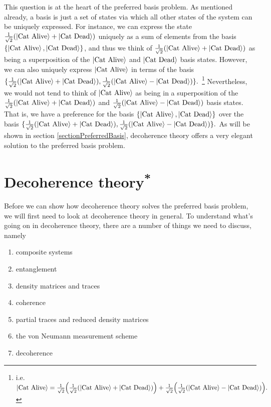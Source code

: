 \documentclass[letter, 12pt]{turabian-thesis}
\theoremstyle{hypothesis}
\let\origfootnote\footnote %
\renewcommand{\footnote}[1]{%
\noindent %
\origfootnote{#1}}
\begin{document}
This question is at the heart of the preferred basis problem. As mentioned already, a basis is just a set of states via which all other states of the system can be uniquely expressed. For instance, we can express the state $\frac{1}{\sqrt{2}}(\ket{\text{Cat Alive}}+\ket{\text{Cat Dead}})$ uniquely as a sum of elements from the basis $\{\ket{\text{Cat Alive}}, \ket{\text{Cat Dead}}\}$, and thus we think of $\frac{1}{\sqrt{2}}(\ket{\text{Cat Alive}}+\ket{\text{Cat Dead}})$ as being a superposition of the $\ket{\text{Cat Alive}}$ and $\ket{\text{Cat Dead}}$ basis states. However, we can also uniquely express  $\ket{\text{Cat Alive}}$ in terms of the basis $\{\frac{1}{\sqrt{2}}(\ket{\text{Cat Alive}}+\ket{\text{Cat Dead}}), \frac{1}{\sqrt{2}}(\ket{\text{Cat Alive}}-\ket{\text{Cat Dead}})\}.$\footnote{i.e. $\ket{\text{Cat Alive}}= \frac{1}{\sqrt{2}}\Big(\frac{1}{\sqrt{2}}(\ket{\text{Cat Alive}}+\ket{\text{Cat Dead}})\Big)+\frac{1}{\sqrt{2}}\Big( \frac{1}{\sqrt{2}}(\ket{\text{Cat Alive}}-\ket{\text{Cat Dead}})\Big). $} Nevertheless, we would not tend to think of $\ket{\text{Cat Alive}}$ as being in a superposition of the $\frac{1}{\sqrt{2}}(\ket{\text{Cat Alive}}+\ket{\text{Cat Dead}}) $ and $\frac{1}{\sqrt{2}}(\ket{\text{Cat Alive}}-\ket{\text{Cat Dead}})$ basis states. That is, we have a preference for the basis $\{\ket{\text{Cat Alive}}, \ket{\text{Cat Dead}}\}$ over the basis $\{\frac{1}{\sqrt{2}}(\ket{\text{Cat Alive}}+\ket{\text{Cat Dead}}), \frac{1}{\sqrt{2}}(\ket{\text{Cat Alive}}-\ket{\text{Cat Dead}})\}.$ As will be shown in section \ref{sectionPreferredBasis}, decoherence theory offers a very elegant solution to the preferred basis problem.

\section{Decoherence theory\label{decotheory}\textsuperscript{*}\protect\footnotemark}
\renewcommand{\thefootnote}{\fnsymbol{footnote}}
\renewcommand*{\thefootnote}{\arabic{footnote}}
Before we can show how decoherence theory solves the preferred basis problem, we will first need to look at decoherence theory in general. To understand what's going on in decoherence theory, there are a number of things we need to discuss, namely
\begin{enumerate}[noitemsep, nosep, topsep=0pt]
\item composite systems
\item entanglement
\item density matrices and traces 
\item coherence
\item partial traces and reduced density matrices
\item the von Neumann measurement scheme
\item decoherence
\end{enumerate}
\end{document}
